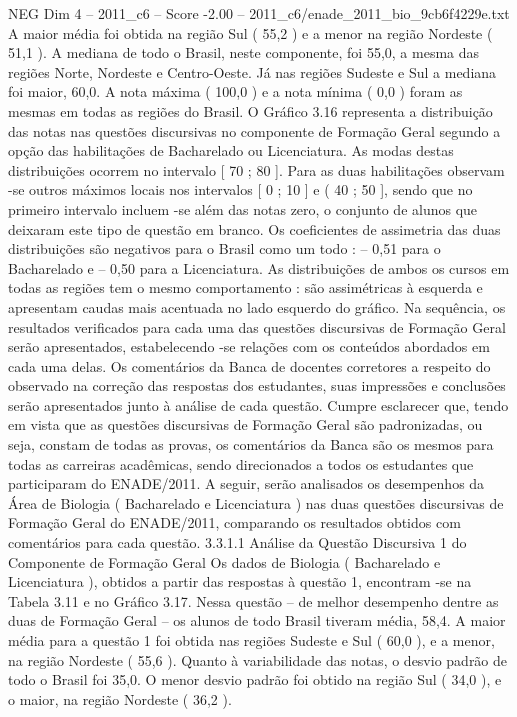 \begin{textsample}{NEG Dim 4 – 2011\_c6 – Score -2.00 – 2011\_c6/enade\_2011\_bio\_9cb6f4229e.txt}
A maior média foi obtida na região Sul ( 55,2 ) e a menor na região Nordeste ( 51,1 ).
A mediana de todo o Brasil, neste componente, foi 55,0, a mesma das regiões Norte, Nordeste e Centro-Oeste.
Já nas regiões Sudeste e Sul a mediana foi maior, 60,0.
A nota máxima ( 100,0 ) e a nota mínima ( 0,0 ) foram as mesmas em todas as regiões do Brasil.
O Gráfico 3.16 representa a distribuição das notas nas questões discursivas no componente de Formação Geral segundo a opção das habilitações de Bacharelado ou Licenciatura.
As modas destas distribuições ocorrem no intervalo [ 70 ; 80 ].
Para as duas habilitações observam -se outros máximos locais nos intervalos [ 0 ; 10 ] e ( 40 ; 50 ], sendo que no primeiro intervalo incluem -se além das notas zero, o conjunto de alunos que deixaram este tipo de questão em branco.
Os coeficientes de assimetria das duas distribuições são negativos para o Brasil como um todo : – 0,51 para o Bacharelado e – 0,50 para a Licenciatura.
As distribuições de ambos os cursos em todas as regiões tem o mesmo comportamento : são assimétricas à esquerda e apresentam caudas mais acentuada no lado esquerdo do gráfico.
Na sequência, os resultados verificados para cada uma das questões discursivas de Formação Geral serão apresentados, estabelecendo -se relações com os conteúdos abordados em cada uma delas.
Os comentários da Banca de docentes corretores a respeito do observado na correção das respostas dos estudantes, suas impressões e conclusões serão apresentados junto à análise de cada questão.
Cumpre esclarecer que, tendo em vista que as questões discursivas de Formação Geral são padronizadas, ou seja, constam de todas as provas, os comentários da Banca são os mesmos para todas as carreiras acadêmicas, sendo direcionados a todos os estudantes que participaram do ENADE/2011.
A seguir, serão analisados os desempenhos da Área de Biologia ( Bacharelado e Licenciatura ) nas duas questões discursivas de Formação Geral do ENADE/2011, comparando os resultados obtidos com comentários para cada questão. 3.3.1.1 Análise da Questão Discursiva 1 do Componente de Formação Geral Os dados de Biologia ( Bacharelado e Licenciatura ), obtidos a partir das respostas à questão 1, encontram -se na Tabela 3.11 e no Gráfico 3.17.
Nessa questão – de melhor desempenho dentre as duas de Formação Geral – os alunos de todo Brasil tiveram média, 58,4.
A maior média para a questão 1 foi obtida nas regiões Sudeste e Sul ( 60,0 ), e a menor, na região Nordeste ( 55,6 ).
Quanto à variabilidade das notas, o desvio padrão de todo o Brasil foi 35,0.
O menor desvio padrão foi obtido na região Sul ( 34,0 ), e o maior, na região Nordeste ( 36,2 ).

\end{textsample}
